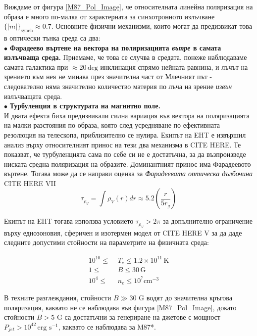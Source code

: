  \noindent Виждаме от фигура \ref{M87_Pol_Image}, че относителната линейна поляризация на образа е много по-малка от характерната за синхотронното излъчване $\lbrace |m| \rbrace_\text{synch}\approx 0.7$. Основните физични механизми, които могат да предизвикат това в оптически тънка среда са два:\\\newline
 $\bullet$ \textbf{Фарадеево въртене на вектора на поляризацията \emph{вътре} в самата излъчваща среда.} Приемаме, че това се случва в средата, понеже наблюдаваме самата галактика при $\approx 20\,\text{deg}$ инклинация спрямо нейната равнина, и лъчът на зрението към нея не минава през значителна част от Млечният път - следователно няма значително количество материя по лъча на зрение \emph{извън} излъчващата среда.\\
 $\bullet$ \textbf{Турбуленция в структурата на магнитно поле.}\\\newline
И двата ефекта биха предизвикали силна вариация във вектора на поляризацията на малки разстояния по образа, която след усредняване по ефективната резолюция на телескопа, приблизително се нулира. Екипът на EHT е извършил анализ върху относителният принос на тези два механизма в CITE HERE. Те показват, че турбуленцията сама по себе си не е достатъчна, за да възпроизведе ниската средна поляризация на образите. Доминантният принос има Фарадеевото въртене. Тогава може да се направи оценка за \emph{Фарадеевата оптическа дълбочина} CITE HERE VII
\begin{equation}
	\tau_{\rho_V} = \int \rho_{V}(r)dr\approx 5.2\left(\frac{r}{5r_g}\right)
\end{equation}
\lfoot{}

Екипът на EHT тогава използва условието $\tau_{\rho_V}>2\pi$ за допълнително ограничение върху еднозоновия, сферичен и изотермен модел от CITE HERE V за да даде следните допустими стойности на параметрите на физичната среда:

\begin{equation}
	\begin{split}
		10^{10} \le\,\, &T_e \le 1.2 \times 10^{11}\,\text{K}\\
		1 \le\,\, &B \le 30\, \text{G}\\
		10^4 \le\,\, &n_e \le 10^7 \text{cm}^{-3}
	\end{split}
\end{equation}

В техните разглеждания, стойности $B \gg 30$ G водят до значителна кръгова поляризация, каквато не се наблюдава във фигура \ref{M87_Pol_Image}, докато стойности $B > 5$ G са достатъчни за генериране на джетове с мощност $P_{jet} > 10^{42}\,\text{erg s}^{-1}$, каквато се наблюдава за M87*.\\

